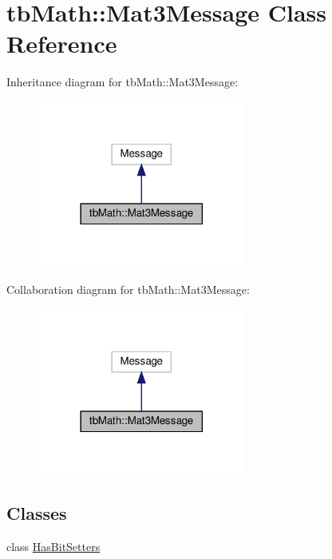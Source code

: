 \hypertarget{classtbMath_1_1Mat3Message}{}\section{tb\+Math\+:\+:Mat3\+Message Class Reference}
\label{classtbMath_1_1Mat3Message}


Inheritance diagram for tb\+Math\+:\+:Mat3\+Message\+:
\nopagebreak
\begin{figure}[H]
\begin{center}
\leavevmode
\includegraphics[width=194pt]{classtbMath_1_1Mat3Message__inherit__graph}
\end{center}
\end{figure}


Collaboration diagram for tb\+Math\+:\+:Mat3\+Message\+:
\nopagebreak
\begin{figure}[H]
\begin{center}
\leavevmode
\includegraphics[width=194pt]{classtbMath_1_1Mat3Message__coll__graph}
\end{center}
\end{figure}
\subsection*{Classes}
\begin{DoxyCompactItemize}
\item 
class \hyperlink{classtbMath_1_1Mat3Message_1_1HasBitSetters}{Has\+Bit\+Setters}
\end{DoxyCompactItemize}
